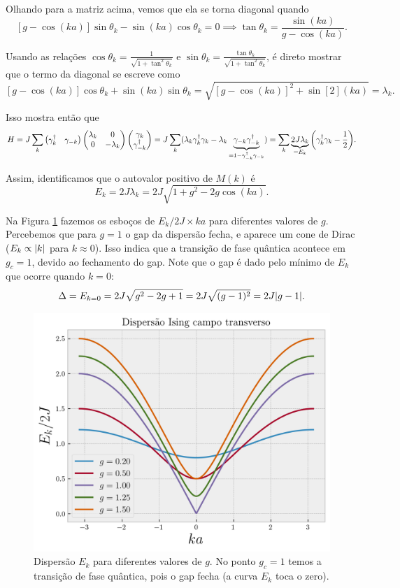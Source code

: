 \documentclass[a4paper,10pt]{article}
\begin{document}
Olhando para a matriz acima, vemos que ela se torna diagonal quando
$$
[g-\cos(ka)] \sin\theta_k - \sin(ka) \cos\theta_k = 0 \implies
\boxed{\tan\theta_k = \frac{\sin(ka)}{g-\cos(ka)}.}
$$

Usando as relações $\cos\theta_k = \frac{1}{\sqrt{1+\tan^2\theta_k}}$ e
$\sin\theta_k = \frac{\tan\theta_k}{\sqrt{1+\tan^2\theta_k}}$, é direto mostrar que o termo da diagonal se escreve como
$$
[g-\cos(ka)] \cos\theta_k + \sin(ka) \sin\theta_k =
\sqrt{[g-\cos(ka)]^2 + \sin[2](ka)} = \lambda_k.
$$

Isso mostra então que
$$
H = J \sum_{k}
\begin{pmatrix}
\gamma_k^\dagger & \gamma_{-k}
\end{pmatrix}
\begin{pmatrix}
\lambda_k & 0 \\
0 & -\lambda_k
\end{pmatrix}
\begin{pmatrix}
\gamma_k \\ \gamma_{-k}^\dagger
\end{pmatrix} =
J \sum_{k} (\lambda_k \gamma_k^\dagger \gamma_k -
\lambda_k \underbrace{\gamma_{-k} \gamma_{-k}^\dagger}_{= 1 - \gamma_{-k}^\dagger \gamma_{-k}}) =
\sum_{k} \underbrace{2 J \lambda_k}_{=E_k} \qty(\gamma_k^\dagger \gamma_k - \frac{1}{2}).
$$

Assim, identificamos que o autovalor positivo de $M(k)$ é
$$
\boxed{ E_k = 2J \lambda_k = 2J \sqrt{1+g^2-2g\cos(ka)}. }
$$

\n

Na Figura \ref{fig:transv_ising2} fazemos os esboços de $E_k/2J \times ka$ para diferentes valores de $g$. Percebemos que para $g = 1$ o gap da dispersão fecha, e aparece um cone de Dirac ($E_k \propto \abs{k}$ para $k \approx 0$). Isso indica que a transição de fase quântica acontece em $g_c = 1$, devido ao fechamento do gap.
Note que o gap é dado pelo mínimo de $E_k$ que ocorre quando $k = 0$:
$$
\Delta = E_{k=0} = 2J \sqrt{g^2 - 2g + 1} = 2J \sqrt{(g-1)^2} = 2J \abs{g-1}.
$$

\n

\begin{figure}[H]
\centering
\includegraphics[width=0.6\linewidth]{fig/transv_ising2.png}
\caption{Dispersão $E_k$ para diferentes valores de $g$. No ponto $g_c = 1$ temos a transição de fase quântica, pois o gap fecha (a curva $E_k$ toca o zero).}
\label{fig:transv_ising2}
\end{figure}
\end{document}
